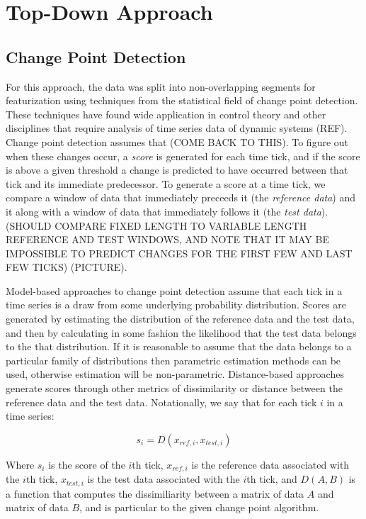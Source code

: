 \chapter{Top-Down Approach}
\section{Change Point Detection}
For this approach, the data was split into non-overlapping segments for
featurization using techniques from the statistical field of change point detection.
These techniques have found wide application in control theory and other disciplines
that require analysis of time series data of dynamic systems (REF).
Change point detection assumes that (COME BACK TO THIS). To figure out when these
changes occur, a \emph{score} is generated for each time tick, and if the score is
above a given threshold a change is predicted to have occurred between that tick
and its immediate predecessor. To generate a score at
a time tick, we compare a window of data that immediately preceeds it (the
\emph{reference data}) and it along with a window of data that immediately follows it
(the \emph{test data}). (SHOULD COMPARE FIXED LENGTH TO VARIABLE LENGTH
REFERENCE AND TEST WINDOWS, AND NOTE THAT IT MAY BE IMPOSSIBLE TO PREDICT CHANGES
FOR THE FIRST FEW AND LAST FEW TICKS) (PICTURE).

Model-based approaches to change point detection assume that each tick in
a time series is a draw from some underlying probability distribution.
Scores are generated by estimating the distribution of the reference data
and the test data, and then by calculating in some fashion the likelihood
that the test data belongs to the that distribution.
If it is reasonable to assume that the data belongs to a particular
family of distributions then parametric estimation methods can be used,
otherwise estimation will be non-parametric. Distance-based
approaches generate scores through other metrics of dissimilarity or
distance between the reference data and the test data. Notationally,
we say that for each tick $i$ in a time series:

\[
s_i = D(x_{ref,i}, x_{test,i})
\]

Where $s_i$ is the score of the $i$th tick, $x_{ref,i}$ is the reference
data associated with the $i$th tick, $x_{test,i}$ is the test data
associated with the $i$th tick, and $D(A,B)$ is a function that computes the
dissimiliarity between a matrix of data $A$ and matrix of data $B$, and is
particular to the given change point algorithm.

